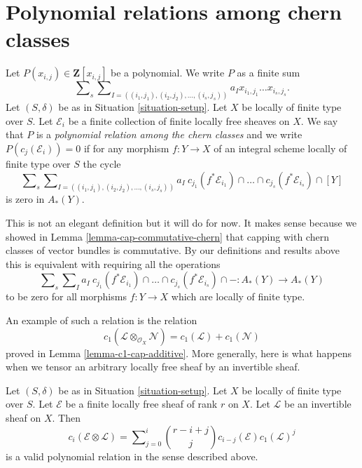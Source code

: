 \section{Polynomial relations among chern classes}
\label{section-relations-chern-classes}

\begin{definition}
\label{definition-polynomial-relation-chern-classes}
Let $P(x_{i, j}) \in \mathbf{Z}[x_{i, j}]$ be a polynomial.
We write $P$ as a finite sum
$$
\sum\nolimits_s
\sum\nolimits_{I = ((i_1, j_1), (i_2, j_2), \ldots, (i_s, j_s))}
a_I x_{i_1, j_1} \ldots x_{i_s, j_s}.
$$
Let $(S, \delta)$ be as in Situation \ref{situation-setup}.
Let $X$ be locally of finite type over $S$.
Let $\mathcal{E}_i$ be a finite collection of finite
locally free sheaves on $X$. We say that $P$
is a {\it polynomial relation among the chern classes}
and we write $P(c_j(\mathcal{E}_i)) = 0$
if for any morphism $f : Y \to X$ of an integral scheme
locally of finite type over $S$ the cycle
$$
\sum\nolimits_s
\sum\nolimits_{I = ((i_1, j_1), (i_2, j_2), \ldots, (i_s, j_s))}
a_I\ c_{j_1}(f^*\mathcal{E}_{i_1}) \cap \ldots
\cap c_{j_s}(f^*\mathcal{E}_{i_s}) \cap [Y]
$$
is zero in $A_*(Y)$.
\end{definition}

\noindent
This is not an elegant definition but it will do
for now. It makes sense because we showed in
Lemma \ref{lemma-cap-commutative-chern} that
capping with chern classes of vector bundles is commutative.
By our definitions and results above
this is equivalent with requiring all the
operations
$$
\sum\nolimits_s
\sum\nolimits_I
a_I\ c_{j_1}(f^*\mathcal{E}_{i_1}) \cap \ldots
\cap c_{j_s}(f^*\mathcal{E}_{i_s}) \cap - :
A_*(Y) \to A_*(Y)
$$
to be zero for all morphisms $f : Y \to X$ which are locally of finite type.

\medskip\noindent
An example of such a relation is the relation
$$
c_1(\mathcal{L} \otimes_{\mathcal{O}_X} \mathcal{N})
=
c_1(\mathcal{L}) + c_1(\mathcal{N})
$$
proved in Lemma \ref{lemma-c1-cap-additive}.
More generally, here is what happens when we tensor an
arbitrary locally free sheaf by an invertible sheaf.

\begin{lemma}
\label{lemma-chern-classes-E-tensor-L}
Let $(S, \delta)$ be as in Situation \ref{situation-setup}.
Let $X$ be locally of finite type over $S$.
Let $\mathcal{E}$ be a finite locally free sheaf of
rank $r$ on $X$. Let $\mathcal{L}$ be an invertible
sheaf on $X$. Then
\begin{equation}
\label{equation-twist}
c_i({\mathcal E} \otimes {\mathcal L})
=
\sum\nolimits_{j = 0}^i
\binom{r - i + j}{j} c_{i - j}({\mathcal E}) c_1({\mathcal L})^j
\end{equation}
is a valid polynomial relation in the sense described above.
\end{lemma}

